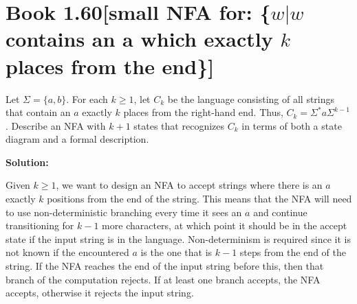 \documentclass[11pt]{article}
\newenvironment{question}[2]
{\newpage\section{#1\texorpdfstring{\hfill}{horizontal spacing}{\rm\normalsize #2}}}{}
\newenvironment{solution}
{\textbf{Solution: }\color{blue}}
{\color{black}}
\begin{document}

\begin{question}{Book 1.60}{[small NFA for: \{\(w | w\) contains an \textbf{a} which exactly \(k\) places from the end\}]}

Let \(\Sigma = \{a,b\}\). For each \(k \geq 1\), let \(C_k\) be the language consisting of all strings that contain an \(a\) exactly \(k\) places from the right-hand end. Thus, \(C_k = \Sigma^* a \Sigma^{k-1}\). Describe an NFA with \(k+1\) states that recognizes \(C_k\) in terms of both a state diagram and a formal description.

\begin{solution}

Given \(k \geq 1\), we want to design an NFA to accept strings where there is an \(a\) exactly \(k\) positions from the end of the string. This means that the NFA will need to use non-deterministic branching every time it sees an \(a\) and continue transitioning for \(k-1\) more characters, at which point it should be in the accept state if the input string is in the language. Non-determinism is required since it is not known if the encountered \(a\) is the one that is \(k-1\) steps from the end of the string. If the NFA reaches the end of the input string before this, then that branch of the computation rejects. If at least one branch accepts, the NFA accepts, otherwise it rejects the input string.


\end{solution}
\end{question}
\end{document}
